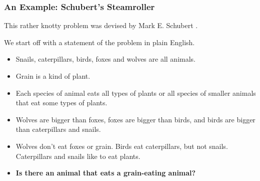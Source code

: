 \subsubsection{An Example: Schubert's Steamroller}

This rather knotty problem was devised by Mark E. Schubert \XXX{}.

We start off with a statement of the problem in plain English.
\begin{itemize}
\item Snails, caterpillars, birds, foxes and wolves are all animals.
\item Grain is a kind of plant.
\item Each species of animal eats all types of plants
or all species of smaller animals that eat some types of plants.
\item Wolves are bigger than foxes, foxes are bigger than birds, and
birds are bigger than caterpillars and snails.
\item Wolves don't eat foxes or grain.  Birds eat caterpillars, but not snails.
Caterpillars and snails like to eat plants.
\item \textbf{Is there an animal that eats a grain-eating animal?}
\end{itemize}

